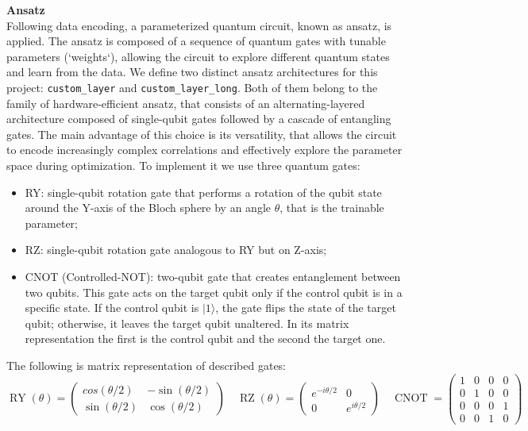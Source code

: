 \documentclass[10pt]{article}
\begin{document}
\noindent \textbf{Ansatz}\\
Following data encoding, a parameterized quantum circuit, known as ansatz, is applied. The ansatz is composed of a sequence of quantum gates with tunable parameters (`weights`), allowing the circuit to explore different quantum states and learn from the data. We define two distinct ansatz architectures for this project: \texttt{custom\_layer} and \texttt{custom\_layer\_long}. 
Both of them belong to the family of hardware-efficient ansatz, that consists of an alternating-layered architecture composed of single-qubit gates followed by a cascade of entangling gates. The main advantage of this choice is its versatility, that allows the circuit to encode increasingly complex correlations and effectively explore the parameter space during optimization. To implement it we use three quantum gates:
\begin{itemize}
    \item RY: single-qubit rotation gate that performs a rotation of the qubit state around the Y-axis of the Bloch sphere by an angle $\theta$, that is the trainable parameter;
    \item RZ: single-qubit rotation gate analogous to RY but on Z-axis;
    \item CNOT (Controlled-NOT): two-qubit gate that creates entanglement between two qubits. This gate acts on the target qubit only if the control qubit is in a specific state. If the control qubit is $|1\rangle$, the gate flips the state of the target qubit; otherwise, it leaves the target qubit unaltered. In its matrix representation the first is the control qubit and the second the target one.
\end{itemize}
The following is matrix representation of described gates: 
\[
    \operatorname{RY}(\theta) = \begin{pmatrix} cos(\theta/2) & -\sin(\theta/2) \\ \sin(\theta/2) & \cos(\theta/2) \end{pmatrix}
    \quad
    \operatorname{RZ}(\theta) = \begin{pmatrix} e^{-i\theta/2} & 0 \\ 0 & e^{i\theta/2} \end{pmatrix}
    \quad
    \operatorname{CNOT} = \begin{pmatrix} 1 & 0 & 0 & 0 \\ 0 & 1 & 0 & 0 \\ 0 & 0 & 0 & 1 \\ 0 & 0 & 1 & 0 \end{pmatrix}
\]
\end{document}
